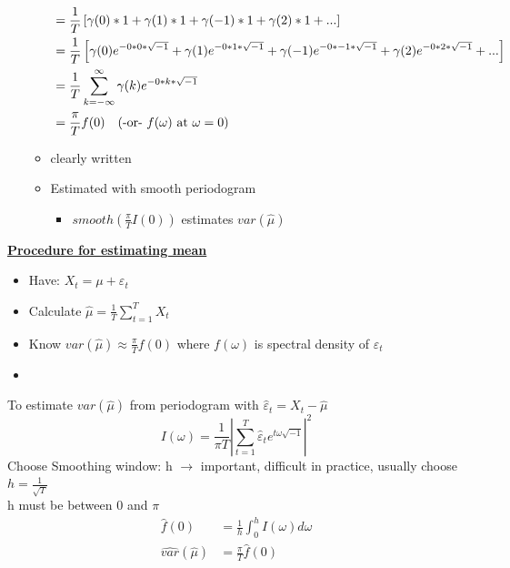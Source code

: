 \begin{itemize}
\begin{itemize}
\begin{align*}
            &= \frac{1}{T} \left[\gamma(0)*1 + \gamma(1)*1+\gamma(-1)*1+\gamma(2)*1 +...\right] \\
            &= \frac{1}{T} \left[\gamma(0)e^{-0*0*\sqrt{-1}} + \gamma(1) e^{-0*1*\sqrt{-1}} + \gamma(-1) e^{-0*-1*\sqrt{-1}} + \gamma(2) e^{-0*2*\sqrt{-1}}+... \right] \\
            &=\frac{1}{T} \sum_{k=-\infty}^\infty \gamma(k) e^{-0*k*\sqrt{-1}} \\
            &= \frac{\pi}{T} f(0) \text{\quad (-or- $f(\omega)$ at $\omega=0$)} \\
        \end{align*}
        \item[]  clearly written
        \item Estimated with smooth periodogram
        \begin{itemize}
            \item[] $smooth(\frac{\pi}{T} I(0))$ estimates $var(\hat{\mu})$
        \end{itemize}
    \end{itemize}
\end{itemize}

\textbf{\underline{Procedure for estimating mean}}
\begin{itemize}
    \item Have: $X_t = \mu + \varepsilon_t$
    \item Calculate $\hat{\mu} = \frac{1}{T} \sum_{t=1}^T X_t$
    \item Know $var(\hat{\mu}) \approx \frac{\pi}{T} f(0)$ where $f(\omega)$ is spectral density of $\varepsilon_t$
    \item 
\end{itemize}
To estimate $var(\hat{\mu})$ from periodogram with $\hat{\varepsilon}_t=X_t-\hat{\mu}$ \[I(\omega)=\frac{1}{\pi T} \left| \sum_{t=1}^T \hat{\varepsilon}_t e^{t\omega \sqrt{-1}} \right|^2 \]
Choose Smoothing window: h $\rightarrow$ important, difficult in practice, usually choose $h=\frac{1}{\sqrt{T}}$\\

\quad h must be between $0$ and $\pi$
\begin{align*}
    \hat{f}(0) &= \frac{1}{h} \int_0^h I(\omega)d\omega \\
    \hat{var}(\hat{\mu}) &= \frac{\pi}{T}\hat{f}(0)
\end{align*}


